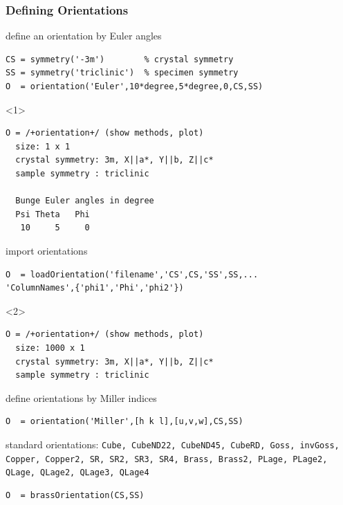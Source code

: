 \documentclass[compress]{beamer}
\begin{document}
\begin{frame}[fragile]
  \frametitle{Defining Orientations}

    \begin{overlayarea}{\textwidth}{8cm}
      define an orientation by Euler angles
  \begin{lstlisting}[style=input]
CS = symmetry('-3m')        % crystal symmetry
SS = symmetry('triclinic')  % specimen symmetry
O  = orientation('Euler',10*degree,5*degree,0,CS,SS)
  \end{lstlisting}
  \begin{onlyenv}<1>
    \vspace{-.3cm}
  \begin{lstlisting}[style=output]
O = /+orientation+/ (show methods, plot)
  size: 1 x 1
  crystal symmetry: 3m, X||a*, Y||b, Z||c*
  sample symmetry : triclinic

  Bunge Euler angles in degree
  Psi Theta   Phi
   10     5     0
  \end{lstlisting}
  \end{onlyenv}

  \pause
  import orientations
  \begin{lstlisting}[style=input]
O  = loadOrientation('filename','CS',CS,'SS',SS,...
'ColumnNames',{'phi1','Phi','phi2'})
  \end{lstlisting}
  \begin{onlyenv}<2>
    \vspace{-.3cm}
  \begin{lstlisting}[style=output]
O = /+orientation+/ (show methods, plot)
  size: 1000 x 1
  crystal symmetry: 3m, X||a*, Y||b, Z||c*
  sample symmetry : triclinic
  \end{lstlisting}
  \end{onlyenv}

\pause

define orientations by Miller indices
   \begin{lstlisting}[style=input]
O  = orientation('Miller',[h k l],[u,v,w],CS,SS)
  \end{lstlisting}

\pause

standard orientations: \texttt{Cube, CubeND22, CubeND45, CubeRD, Goss,
invGoss, Copper, Copper2, SR, SR2, SR3, SR4, Brass, Brass2, PLage, PLage2,
QLage, QLage2, QLage3, QLage4}

\begin{lstlisting}[style=input]
O  = brassOrientation(CS,SS)
\end{lstlisting}
\end{overlayarea}
\end{frame}
\end{document}
